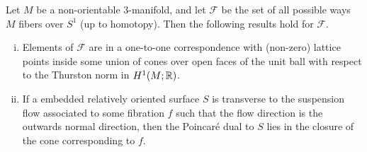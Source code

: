 \begin{thm}
  \label{thm:NOThur1}
  Let $M$ be a non-orientable $3$-manifold, and let $\mathcal{F}$ be the set of all possible
  ways $M$ fibers over $S^1$ (up to homotopy). Then the following results hold for $\mathcal{F}$.
  \begin{enumerate}[(i)]
  \item Elements of $\mathcal{F}$ are in a one-to-one correspondence with (non-zero) lattice points
    inside some union of cones over open faces of the unit ball with respect to the Thurston norm
    in $H^1(M; \mathbb{R})$.
  \item If a embedded relatively oriented surface $S$ is transverse to the suspension flow
    associated to some fibration $f$ such that the flow direction is the outwards normal direction,
    then the Poincar\'e dual to $S$ lies in the closure of the cone corresponding to $f$.
  \end{enumerate}
\end{thm}
